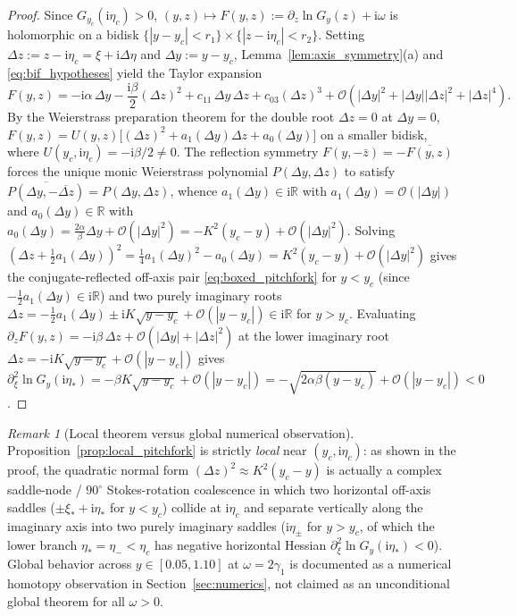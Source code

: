 \documentclass[11pt,a4paper,reqno]{amsart}
\theoremstyle{definition}
\theoremstyle{remark}
\newtheorem{remark}[theorem]{Remark}
\numberwithin{equation}{section}
\newcommand{\ii}{\mathrm{i}}
\begin{document}
\begin{proof}
Since $G_{y_c}(\ii\eta_c) > 0$, $(y,z) \mapsto F(y,z) := \partial_z\ln G_y(z) + \ii\omega$ is holomorphic on a bidisk $\{|y-y_c| < r_1\} \times \{|z - \ii\eta_c| < r_2\}$. Setting $\Delta z := z - \ii\eta_c = \xi + \ii\Delta\eta$ and $\Delta y := y - y_c$, Lemma~\ref{lem:axis_symmetry}(a) and \eqref{eq:bif_hypotheses} yield the Taylor expansion
\[
F(y,z) = -\ii\alpha\,\Delta y - \frac{\ii\beta}{2}(\Delta z)^2 + c_{11}\,\Delta y\,\Delta z + c_{03}(\Delta z)^3 + \mathcal{O}\!\left(|\Delta y|^2 + |\Delta y||\Delta z|^2 + |\Delta z|^4\right).
\]
By the Weierstrass preparation theorem for the double root $\Delta z = 0$ at $\Delta y = 0$, $F(y,z) = U(y,z)\big[(\Delta z)^2 + a_1(\Delta y)\Delta z + a_0(\Delta y)\big]$ on a smaller bidisk, where $U(y_c,\ii\eta_c) = -\ii\beta/2 \neq 0$. The reflection symmetry $F(y,-\bar{z}) = -\overline{F(y,z)}$ forces the unique monic Weierstrass polynomial $P(\Delta y, \Delta z)$ to satisfy $\overline{P(\Delta y, -\overline{\Delta z})} = P(\Delta y, \Delta z)$, whence $a_1(\Delta y) \in \ii\mathbb{R}$ with $a_1(\Delta y) = \mathcal{O}(|\Delta y|)$ and $a_0(\Delta y) \in \mathbb{R}$ with $a_0(\Delta y) = \frac{2\alpha}{\beta}\Delta y + \mathcal{O}(|\Delta y|^2) = -K^2(y_c - y) + \mathcal{O}(|\Delta y|^2)$. Solving $(\Delta z + \frac{1}{2}a_1(\Delta y))^2 = \frac{1}{4}a_1(\Delta y)^2 - a_0(\Delta y) = K^2(y_c - y) + \mathcal{O}(|\Delta y|^2)$ gives the conjugate-reflected off-axis pair \eqref{eq:boxed_pitchfork} for $y < y_c$ (since $-\frac{1}{2}a_1(\Delta y) \in \ii\mathbb{R}$) and two purely imaginary roots $\Delta z = -\frac{1}{2}a_1(\Delta y) \pm \ii K\sqrt{y - y_c} + \mathcal{O}(|y-y_c|) \in \ii\mathbb{R}$ for $y > y_c$. Evaluating $\partial_z F(y,z) = -\ii\beta\,\Delta z + \mathcal{O}(|\Delta y| + |\Delta z|^2)$ at the lower imaginary root $\Delta z = -\ii K\sqrt{y - y_c} + \mathcal{O}(|y-y_c|)$ gives $\partial_\xi^2\ln G_y(\ii\eta_*) = -\beta K\sqrt{y - y_c} + \mathcal{O}(|y-y_c|) = -\sqrt{2\alpha\beta(y - y_c)} + \mathcal{O}(|y-y_c|) < 0$.
\end{proof}

\begin{remark}[Local theorem versus global numerical observation]\label{rem:local_vs_global}
Proposition~\ref{prop:local_pitchfork} is strictly \emph{local} near $(y_c, \ii\eta_c)$: as shown in the proof, the quadratic normal form $(\Delta z)^2 \approx K^2(y_c - y)$ is actually a complex saddle-node / $90^\circ$ Stokes-rotation coalescence in which two horizontal off-axis saddles ($\pm\xi_* + \ii\eta_*$ for $y < y_c$) collide at $\ii\eta_c$ and separate vertically along the imaginary axis into two purely imaginary saddles ($\ii\eta_\pm$ for $y > y_c$, of which the lower branch $\eta_* = \eta_- < \eta_c$ has negative horizontal Hessian $\partial_\xi^2\ln G_y(\ii\eta_*) < 0$). Global behavior across $y \in [0.05, 1.10]$ at $\omega = 2\gamma_1$ is documented as a numerical homotopy observation in Section~\ref{sec:numerics}, not claimed as an unconditional global theorem for all $\omega > 0$.
\end{remark}
\end{document}
